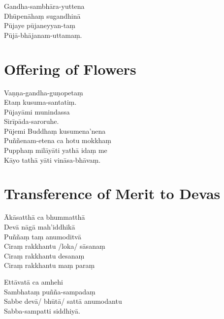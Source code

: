 
\begin{paritta}
Gandha-sambhāra-yuttena\\
Dhūpenāhaṃ sugandhinā\\
Pūjaye pūjaneyyan-taṃ\\
Pūjā-bhājanam-uttamaṃ.
\end{paritta}

\section{Offering of Flowers}


\begin{paritta}
Vaṇṇa-gandha-guṇopetaṃ\\
Etaṃ kusuma-santatiṃ.\\
Pūjayāmi munindassa\\
Sirīpāda-saroruhe.\\
Pūjemi Buddhaṃ kusumena'nena\\
Puññenam-etena ca hotu mokkhaṃ\\
Pupphaṃ milāyāti yathā idaṃ me\\
Kāyo tathā yāti vināsa-bhāvaṃ.
\end{paritta}

\section{Transference of Merit to Devas}


\begin{paritta}
Ākāsatthā ca bhummatthā\\
Devā nāgā mah'iddhikā\\
Puññaṃ taṃ anumoditvā\\
Ciraṃ rakkhantu /loka/ sāsanaṃ\\
Ciraṃ rakkhantu desanaṃ\\
Ciraṃ rakkhantu maṃ paraṃ
\end{paritta}

\clearpage

\begin{paritta}
Ettāvatā ca amhehi\\
Sambhataṃ puñña-sampadaṃ\\
Sabbe devā/ bhūtā/ sattā anumodantu\\
Sabba-sampatti siddhiyā.
\end{paritta}

